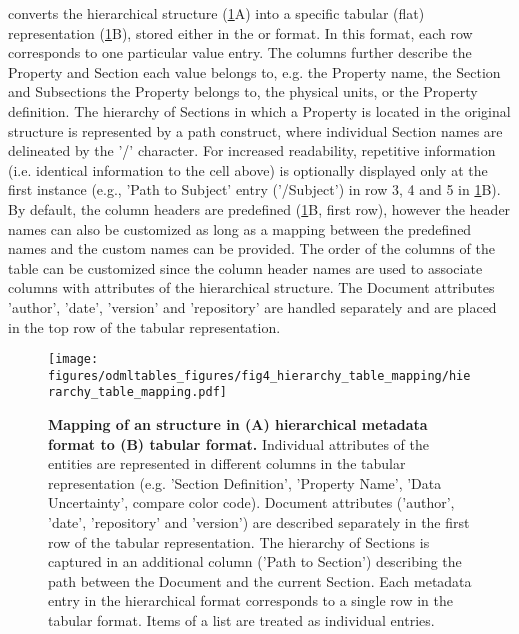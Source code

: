  converts the hierarchical  structure (\cref{fig:tree_and_table}A) into a specific tabular (flat) representation (\cref{fig:tree_and_table}B), stored either in the  or  format. In this format, each row corresponds to one particular value entry. The columns further describe the Property and Section each value belongs to, e.g. the Property name, the Section and Subsections the Property belongs to, the physical units, or the Property definition. The hierarchy of Sections in which a Property is located in the original  structure is represented by a path construct, where individual Section names are delineated by the '/' character. For increased readability, repetitive information (i.e. identical information to the cell above) is optionally displayed only at the first instance (e.g., 'Path to Subject' entry ('/Subject') in row 3, 4 and 5 in \cref{fig:tree_and_table}B). By default, the  column headers are predefined (\cref{fig:tree_and_table}B, first row), however the header names can also be customized as long as a mapping between the predefined names and the custom names can be provided. The order of the columns of the table can be customized since the column header names are used to associate columns with attributes of the hierarchical  structure. The  Document attributes 'author', 'date', 'version' and 'repository' are handled separately and are placed in the top row of the tabular  representation.

\begin{figure}[!ht]
\begin{center}
\texttt{[image: figures/odmltables\_figures/fig4\_hierarchy\_table\_mapping/hierarchy\_table\_mapping.pdf]}
\caption[Mapping of an  structure in (A) hierarchical metadata format to (B) tabular format.]{{\label{fig:tree_and_table}
\textbf{Mapping of an  structure in (A) hierarchical metadata format to (B) tabular format.} Individual attributes of the  entities are represented in different columns in the tabular representation (e.g. 'Section Definition', 'Property Name', 'Data Uncertainty', compare color code). Document attributes ('author', 'date', 'repository' and 'version') are described separately in the first row of the tabular representation. The hierarchy of Sections is captured in an additional column ('Path to Section') describing the path between the  Document and the current Section. Each metadata entry in the hierarchical format corresponds to a single row in the tabular format. Items of a list are treated as individual entries.
}}
\end{center}
\end{figure}


